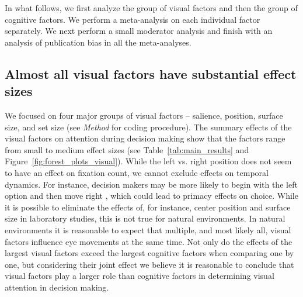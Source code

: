 In what follows, we first analyze the group of visual factors and then the group of cognitive factors. We perform a meta-analysis on each individual factor  separately. We next perform a small moderator analysis and finish with an analysis of publication bias in all the meta-analyses.


\subsection{Almost all visual factors have substantial effect sizes}

We focused on four major groups of visual factors -- salience, position, surface size, and set size (see \textit{Method} for coding procedure). The summary effects of the visual factors on attention during decision making show that the factors range from small to medium effect sizes (see Table~\ref{tab:main_results} and Figure~\ref{fig:forest_plots_visual}).  While the left vs. right position does not seem to have an effect on fixation count, we cannot exclude effects on temporal dynamics. For instance, decision makers may be more likely to begin with the left option and then move right \citep{fiedler2012}, which could lead to primacy effects on choice.  While it is possible to eliminate the effects of, for instance, center position and surface size in laboratory studies, this is not true for natural environments. In natural environments it is reasonable to expect that multiple, and most likely all, visual factors influence eye movements at the same time. Not only do the effects of the largest visual factors exceed the largest cognitive factors when comparing one by one, but considering their joint effect we believe it is reasonable to conclude that visual factors play a larger role than cognitive factors in determining visual attention in decision making. 


